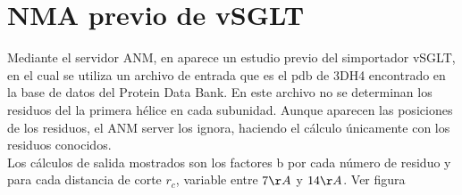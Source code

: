 \section{NMA previo de vSGLT}
Mediante el servidor ANM, en  aparece un estudio previo del simportador vSGLT, en el cual se utiliza un archivo de entrada que es el pdb de 3DH4 encontrado en la base de datos del Protein Data Bank. En este archivo no se determinan los residuos del la primera h\'{e}lice en cada subunidad. Aunque aparecen las posiciones de los residuos, el ANM server los ignora, haciendo el c\'{a}lculo \'{u}nicamente con los residuos conocidos.\\
Los c\'{a}lculos de salida mostrados son los factores b por cada n\'{u}mero de residuo y para cada distancia de corte $r_c$, variable entre $7\AA$ y $14\AA$. Ver figura \\ 
